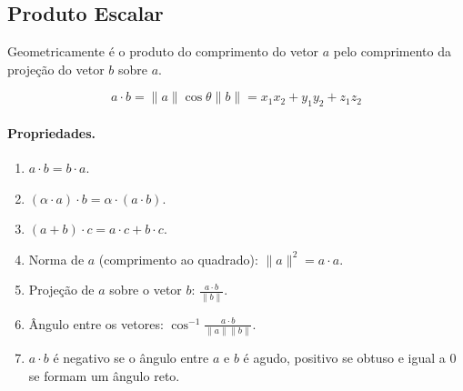 \subsection{Produto Escalar}

Geometricamente é o produto do comprimento do vetor $a$ pelo comprimento da projeção do vetor $b$ sobre $a$.

\[
a \cdot b = \|a\|\cos\theta \|b\| = x_1x_2+y_1y_2+z_1z_2
\]

\paragraph{Propriedades.}

\begin{multicols}{2}
	\begin{enumerate}
		\item $a \cdot b = b \cdot a$.
		\item $(\alpha \cdot a) \cdot b = \alpha\cdot(a \cdot b)$.
		\item $(a+b)\cdot c = a\cdot c + b \cdot c$.
		\item Norma de $a$ (comprimento ao quadrado): $\|a\|^2 = a \cdot a$.
		\item Projeção de $a$ sobre o vetor $b$: $\frac{a \cdot b}{\|b\|}$.
		\item Ângulo entre os vetores: $\cos^{-1}{\frac{a \cdot b}{\|a\|\|b\|}}$.
		\item $a \cdot b$ é negativo se o ângulo entre $a$ e $b$ é agudo, positivo se obtuso e igual a 0 se formam um ângulo reto.
	\end{enumerate}
\end{multicols}